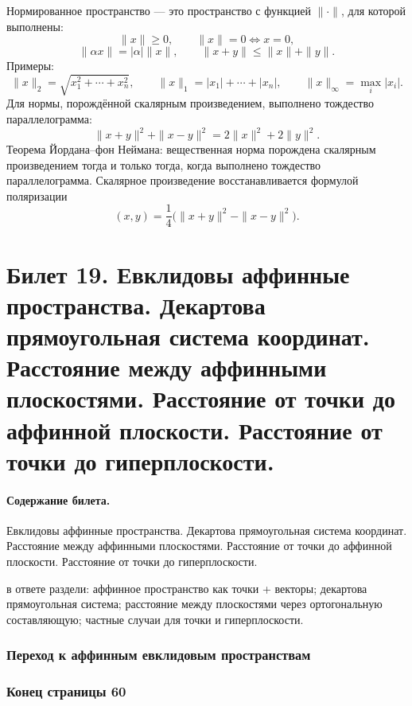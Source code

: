 \documentclass[12pt,a4paper]{article}
\theoremstyle{definition}
\theoremstyle{plain}
\theoremstyle{remark}
\newenvironment{planadd}{\begin{planbox}}{\end{planbox}}
\begin{document}
Нормированное пространство --- это пространство с функцией $\|\cdot\|$, для которой выполнены:
\[
    \|x\|\ge0,
    \qquad
    \|x\|=0\Longleftrightarrow x=0,
\]
\[
    \|\alpha x\|=|\alpha|\|x\|,
    \qquad
    \|x+y\|\le \|x\|+\|y\|.
\]
Примеры:
\[
    \|x\|_2=\sqrt{x_1^2+\cdots+x_n^2},
    \qquad
    \|x\|_1=|x_1|+\cdots+|x_n|,
    \qquad
    \|x\|_\infty=\max_i |x_i|.
\]
Для нормы, порождённой скалярным произведением, выполнено тождество параллелограмма:
\[
    \|x+y\|^2+\|x-y\|^2=2\|x\|^2+2\|y\|^2.
\]
Теорема Йордана--фон Неймана: вещественная норма порождена скалярным произведением тогда и только тогда, когда выполнено тождество параллелограмма. Скалярное произведение восстанавливается формулой поляризации
\[
    (x,y)=\frac{1}{4}\bigl(\|x+y\|^2-\|x-y\|^2\bigr).
\]

\clearpage

\section{Билет 19. Евклидовы аффинные пространства. Декартова прямоугольная система координат. Расстояние между аффинными плоскостями. Расстояние от точки до аффинной плоскости. Расстояние от точки до гиперплоскости.}

\paragraph{Содержание билета.} Евклидовы аффинные пространства. Декартова прямоугольная система координат. Расстояние между аффинными плоскостями. Расстояние от точки до аффинной плоскости. Расстояние от точки до гиперплоскости.

\begin{planadd}

в ответе раздели: аффинное пространство как точки + векторы; декартова прямоугольная система; расстояние между плоскостями через ортогональную составляющую; частные случаи для точки и гиперплоскости.

\end{planadd}

\subsubsection{Переход к аффинным евклидовым пространствам}

\subsubsection*{Конец страницы 60}
\end{document}
